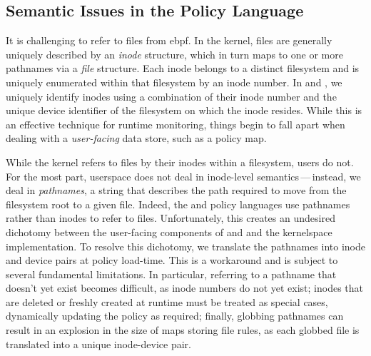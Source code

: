 \subsection{Semantic Issues in the Policy Language}%
\label{ss:disc-semantic-issues}

It is challenging to refer to files from \gls{ebpf}. In the kernel, files are generally uniquely
described by an \textit{inode} structure, which in turn maps to one or more pathnames via
a \textit{file} structure. Each inode belongs to a distinct filesystem and is uniquely
enumerated within that filesystem by an inode number.  In \bpfbox{} and \bpfcontain{}, we
uniquely identify inodes using a combination of their inode number and the unique device
identifier of the filesystem on which the inode resides. While this is an effective
technique for runtime monitoring, things begin to fall apart when dealing with
a \textit{user-facing} data store, such as a policy map.

While the kernel refers to files by their inodes within a filesystem, users do not. For
the most part, userspace does not deal in inode-level semantics\,---\,instead, we deal in
\textit{pathnames}, a string that describes the path required to move from the filesystem
root to a given file. Indeed, the \bpfbox{} and \bpfcontain{} policy languages use
pathnames rather than inodes to refer to files. Unfortunately, this creates an undesired
dichotomy between the user-facing components of \bpfbox{} and \bpfcontain{} and the
kernelspace implementation.  To resolve this dichotomy, we translate the pathnames into
inode and device pairs at policy load-time. This is a workaround and is subject to several
fundamental limitations. In particular, referring to a pathname that doesn't yet exist
becomes difficult, as inode numbers do not yet exist; inodes that are deleted or freshly
created at runtime must be treated as special cases, dynamically updating the policy as
required; finally, globbing pathnames can result in an explosion in the size of maps
storing file rules, as each globbed file is translated into a unique inode-device pair.

